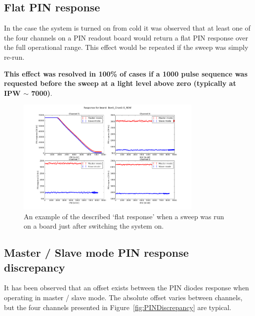 \documentclass[12pt]{report}
\begin{document}
\subsection{Flat PIN response}
In the case the system is turned on from cold it was observed that at least one of the four channels on a PIN readout board would return a flat PIN response over the full operational range. This effect would be repeated if the sweep was simply re-run. 

\textbf{This effect was resolved in 100\% of cases if a 1000 pulse sequence was requested before the sweep at a light level above zero (typically at IPW $\sim$ 7000)}. 

\begin{figure}[htp]
	\begin{center}
		\includegraphics[width=0.8\textwidth]{PINFlatResponse}
		\caption{An example of the described `flat response' when a sweep was run on a board just after switching the system on.}
		\label{fig:PINFlatResponse}
	\end{center}
\end{figure}

\subsection{Master / Slave mode PIN response discrepancy}
It has been observed that an offset exists between the PIN diodes response when operating in master / slave mode. The absolute offset varies between channels, but the four channels presented in Figure~\ref{fig:PINDiscrepancy} are typical.
\end{document}
